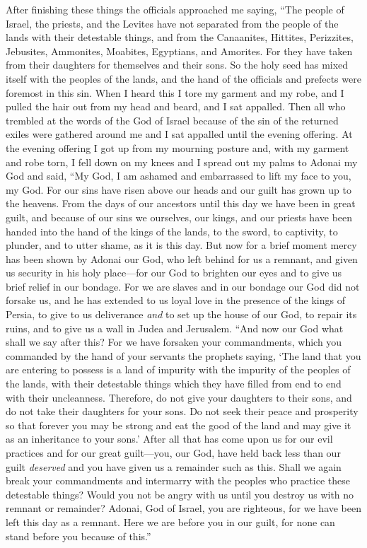 \begin{biblechapter} %
 After finishing these things the officials approached me saying, “The people of Israel, the priests, and the Levites have not separated from the people of the lands with their detestable things, and from the Canaanites, Hittites, Perizzites, Jebusites, Ammonites, Moabites, Egyptians, and Amorites.
\verse For they have taken from their daughters for themselves and their sons. So the holy seed has mixed itself with the peoples of the lands, and the hand of the officials and prefects were foremost in this sin.
\verse When I heard this I tore my garment and my robe, and I pulled the hair out from my head and beard, and I sat appalled.
\verse Then all who trembled at the words of the God of Israel because of the sin of the returned exiles were gathered around me and I sat appalled until the evening offering.
 At the evening offering I got up from my mourning posture and, with my garment and robe torn, I fell down on my knees and I spread out my palms to Adonai my God
\verse and said, “My God, I am ashamed and embarrassed to lift my face to you, my God. For our sins have risen above our heads and our guilt has grown up to the heavens.
\verse From the days of our ancestors until this day we have been in great guilt, and because of our sins we ourselves, our kings, and our priests have been handed into the hand of the kings of the lands, to the sword, to captivity, to plunder, and to utter shame, as it is this day.
\verse But now for a brief moment mercy has been shown by Adonai our God, who left behind for us a remnant, and given us security in his holy place—for our God to brighten our eyes and to give us brief relief in our bondage.
\verse For we are slaves and in our bondage our God did not forsake us, and he has extended to us loyal love in the presence of the kings of Persia, to give to us deliverance \textit{and} to set up the house of our God, to repair its ruins, and to give us a wall in Judea and Jerusalem.
\verse “And now our God what shall we say after this? For we have forsaken your commandments,
\verse which you commanded by the hand of your servants the prophets saying, ‘The land that you are entering to possess is a land of impurity with the impurity of the peoples of the lands, with their detestable things which they have filled from end to end with their uncleanness.
\verse Therefore, do not give your daughters to their sons, and do not take their daughters for your sons. Do not seek their peace and prosperity so that forever you may be strong and eat the good of the land and may give it as an inheritance to your sons.’
\verse After all that has come upon us for our evil practices and for our great guilt—you, our God, have held back less than our guilt \textit{deserved} and you have given us a remainder such as this.
\verse Shall we again break your commandments and intermarry with the peoples who practice these detestable things? Would you not be angry with us until you destroy us with no remnant or remainder?
\verse Adonai, God of Israel, you are righteous, for we have been left this day as a remnant. Here we are before you in our guilt, for none can stand before you because of this.”
\end{biblechapter}
